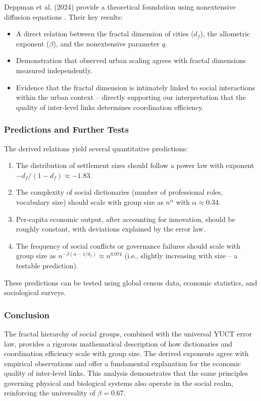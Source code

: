 \documentclass[11pt]{article}
\theoremstyle{remark}
\begin{document}
	Deppman et al. (2024) provide a theoretical foundation using nonextensive diffusion equations \cite{Deppman2024}. Their key results:
	\begin{itemize}
		\item A direct relation between the fractal dimension of cities (\(d_f\)), the allometric exponent (\(\beta\)), and the nonextensive parameter \(q\).
		\item Demonstration that observed urban scaling agrees with fractal dimensions measured independently.
		\item Evidence that the fractal dimension is intimately linked to social interactions within the urban context – directly supporting our interpretation that the quality of inter‑level links determines coordination efficiency.
	\end{itemize}
	
	\subsubsection{Predictions and Further Tests}
	The derived relations yield several quantitative predictions:
	\begin{enumerate}
		\item The distribution of settlement sizes should follow a power law with exponent \(-d_f/(1-d_f) \approx -1.83\).
		\item The complexity of social dictionaries (number of professional roles, vocabulary size) should scale with group size as \(n^{\alpha}\) with \(\alpha \approx 0.34\).
		\item Per‑capita economic output, after accounting for innovation, should be roughly constant, with deviations explained by the error law.
		\item The frequency of social conflicts or governance failures should scale with group size as \(n^{-\beta(\alpha - 1/d_f)} \approx n^{0.074}\) (i.e., slightly increasing with size – a testable prediction).
	\end{enumerate}
	These predictions can be tested using global census data, economic statistics, and sociological surveys.
	
	\subsubsection{Conclusion}
	The fractal hierarchy of social groups, combined with the universal YUCT error law, provides a rigorous mathematical description of how dictionaries and coordination efficiency scale with group size. The derived exponents agree with empirical observations and offer a fundamental explanation for the economic quality of inter‑level links. This analysis demonstrates that the same principles governing physical and biological systems also operate in the social realm, reinforcing the universality of \(\beta = 0.67\).
	
\end{document}
